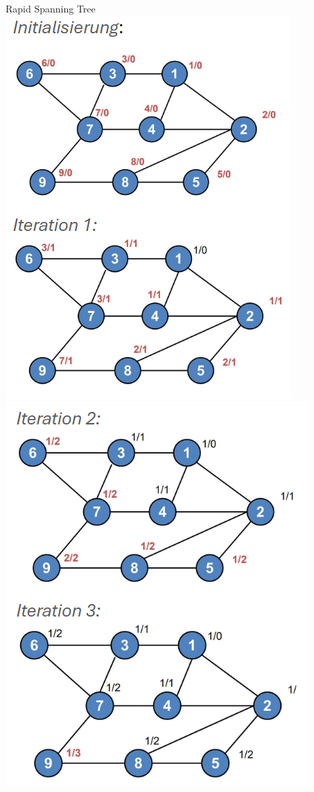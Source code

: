 \begin{example2}[breakable]{Rapid Spanning Tree}\\
    \includegraphics[width=0.7\linewidth]{images/rapid_spanning_tree1.png}\\
    \includegraphics[width=0.7\linewidth]{images/rapid_spanning_tree2.png}\\

\end{example2}
